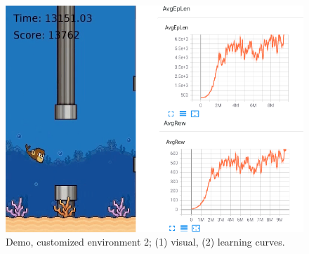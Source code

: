 \begin{figure}[h]
\includegraphics[scale=0.5]{img/I/Selection_101.png}
\centering
\captionsetup{justification=centering}
\caption{Demo, customized environment 2; (1) visual, (2) learning curves.}
\end{figure}

\pagebreak